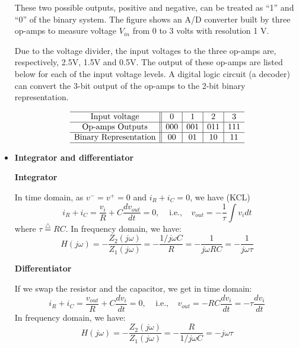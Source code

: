 \documentclass{article}
\begin{document}
\begin{itemize}
  These two possible outputs, positive and negative, can be treated as ``1'' 
  and ``0'' of the binary system. The figure shows an A/D converter built by
  three op-amps to measure voltage $V_{in}$ from 0 to 3 volts with resolution 
  1 V.


  Due to the voltage divider, the input voltages to the three op-amps are, 
  respectively, 2.5V, 1.5V and 0.5V. The output of these op-amps are listed
  below for each of the input voltage levels. A digital logic circuit (a
  decoder) can convert the 3-bit output of the op-amps to the 2-bit binary 
  representation.

  \begin{equation}
  \begin{array}{c||c|c|c|c}\hline
    \mbox{Input voltage}        & 0 	& 1	& 2	& 3	\\\hline
    \mbox{Op-amps Outputs}	& 000	& 001	& 011	& 111	\\\hline
    \mbox{Binary Representation}	& 00	& 01	& 10	& 11	\\ \hline
  \end{array}
  \end{equation}


\item {\bf Integrator and differentiator}


  {\bf Integrator}

  In time domain, as $v^-=v^+=0$ and $i_R+i_C=0$, we have (KCL)
  \begin{equation}
  i_R+i_C=\frac{v_i}{R}+C\frac{d v_{out}}{dt}=0,
  \;\;\;\; \mbox{i.e.,}\;\;\;\;v_{out}=-\frac{1}{\tau} \int v_i dt	
  \end{equation}
  where $\tau \stackrel{\triangle}{=}RC$. In frequency domain, we have:
  \begin{equation}
  H(j\omega)=-\frac{Z_2(j\omega)}{Z_1(j\omega)}=-\frac{1/j\omega C}{R}
  =-\frac{1}{j\omega RC}=-\frac{1}{j\omega \tau}	
  \end{equation}

  {\bf Differentiator}

  If we swap the resistor and the capacitor, we get in time domain:
  \begin{equation} 
  i_R+i_C=\frac{v_{out}}{R}+C\frac{d v_i}{dt}=0,\;\;\;\;
  \mbox{i.e.,}\;\;\;\;v_{out}=-RC \frac{d v_i}{dt}=-\tau \frac{d v_i}{dt}	
  \end{equation}
  In frequency domain, we have:
  \begin{equation} 
  H(j\omega)=-\frac{Z_2(j\omega)}{Z_1(j\omega)}=-\frac{R}{1/j\omega C}
  =-j\omega \tau 
  \end{equation}


\end{itemize}
\end{document}
